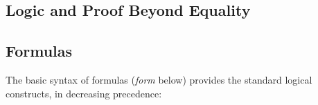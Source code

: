 %
\begin{isabellebody}%
\def\isabellecontext{Logic}%
%
\isadelimtheory
%
\endisadelimtheory
%
\isatagtheory
%
\endisatagtheory
{\isafoldtheory}%
%
\isadelimtheory
%
\endisadelimtheory
%
\begin{isamarkuptext}%
\vspace{-5ex}
\section{Logic and Proof Beyond Equality}
\label{sec:Logic}

\subsection{Formulas}

The basic syntax of formulas (\textit{form} below)
provides the standard logical constructs, in decreasing precedence:
\[
\begin{array}{rcl}


\end{array}\]
\end{isamarkuptext}
\end{isabellebody}
